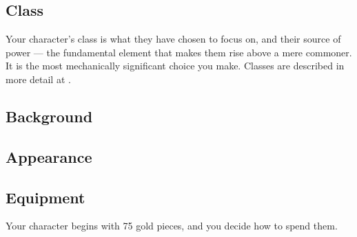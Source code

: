     \subsection{Class}
        Your character's class is what they have chosen to focus on, and their source of power --- the fundamental element that makes them rise above a mere commoner.
        It is the most mechanically significant choice you make.
        Classes are described in more detail at .

    \subsection{Background}

    \subsection{Appearance}

    \subsection{Equipment}
        Your character begins with 75 gold pieces, and you decide how to spend them.
